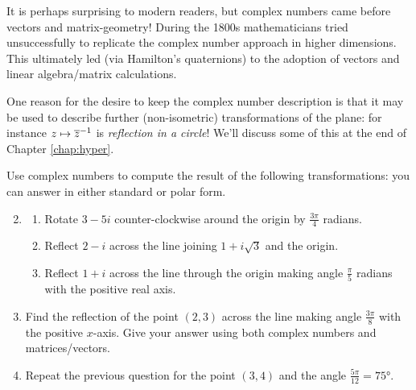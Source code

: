It is perhaps surprising to modern readers, but complex numbers came before vectors and matrix-geometry! During the 1800s mathematicians tried unsuccessfully to replicate the complex number approach in higher dimensions. This ultimately led (via Hamilton's quaternions) to the adoption of vectors and linear algebra/matrix calculations.\smallbreak

One reason for the desire to keep the complex number description is that it may be used to describe further (non-isometric) transformations of the plane: for instance $z\mapsto\overline{z}^{-1}$ is \emph{reflection in a circle}! We'll discuss some of this at the end of Chapter \ref{chap:hyper}.

\begin{exercises}
\exstart Use complex numbers to compute the result of the following transformations: you can answer in either standard or polar form.
\begin{enumerate}\setcounter{enumi}{1}
  \item[]\begin{enumerate}
    \item Rotate $3-5i$ counter-clockwise around the origin by $\frac{3\pi}4$ radians.
    \item Reflect $2-i$ across the line joining $1+i\sqrt 3$ and the origin.
    \item Reflect $1+i$ across the line through the origin making angle $\frac\pi 5$ radians with the positive real axis.
  \end{enumerate}
  
  
  
  \item Find the reflection of the point $(2,3)$ across the line making angle $\frac{3\pi}8$ with the positive $x$-axis. Give your answer using both complex numbers and matrices/vectors.
  
  
	\item Repeat the previous question for the point $(3,4)$ and the angle $\frac{5\pi}{12}=\ang{75}$.
  

\end{enumerate}
\end{exercises}
